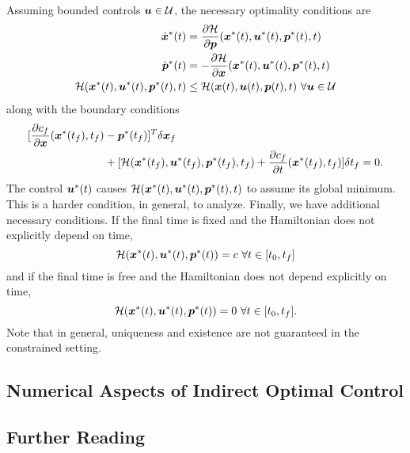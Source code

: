 Assuming bounded controls $\bm{u} \in \mathcal{U}$, the necessary optimality conditions are 
\begin{align}
    \label{eq:nec_pmp_conds1}
    \dot{\bm{x}}^*(t) &= \frac{\partial \mathcal{H}}{\partial \bm{p}}(\bm{x}^*(t),\bm{u}^*(t),\bm{p}^*(t),t)\\
    \dot{\bm{p}}^*(t) &= -\frac{\partial \mathcal{H}}{\partial \bm{x}}(\bm{x}^*(t),\bm{u}^*(t),\bm{p}^*(t),t)\\
    \mathcal{H}(\bm{x}^*(t),\bm{u}^*(t), \bm{p}^*(t), t) &\leq \mathcal{H}(\bm{x}(t),\bm{u}(t), \bm{p}(t), t) \,\,\forall \bm{u} \in \mathcal{U}
    \label{eq:nec_pmp_conds3}
\end{align}
along with the boundary conditions
\begin{align}
\label{eq:ham_bcs}
    [\frac{\partial c_f}{\partial \bm{x}}(\bm{x}^*(t_f),t_f)& - \bm{p}^*(t_f)]^T \delta \bm{x}_f\\
    & + [ \mathcal{H}(\bm{x}^*(t_f),\bm{u}^*(t_f), \bm{p}^*(t_f), t_f) + \frac{\partial c_f}{\partial t}(\bm{x}^*(t_f),t_f)] \delta t_f = 0. \nonumber
\end{align}
The control $\bm{u}^*(t)$ causes $\mathcal{H}(\bm{x}^*(t),\bm{u}^*(t),\bm{p}^*(t),t)$ to assume its global minimum. This is a harder condition, in general, to analyze. Finally, we have additional necessary conditions. If the final time is fixed and the Hamiltonian does not explicitly depend on time, 
\begin{equation}
    \mathcal{H}(\bm{x}^*(t),\bm{u}^*(t),\bm{p}^*(t)) = c \,\, \forall t \in [t_0,t_f]
\end{equation}
and if the final time is free and the Hamiltonian does not depend explicitly on time, 
\begin{equation}
    \mathcal{H}(\bm{x}^*(t),\bm{u}^*(t),\bm{p}^*(t)) = 0 \,\, \forall t \in [t_0,t_f].
\end{equation}
Note that in general, uniqueness and existence are not guaranteed in the constrained setting. 


\subsection{Numerical Aspects of Indirect Optimal Control}



\subsection{Further Reading}